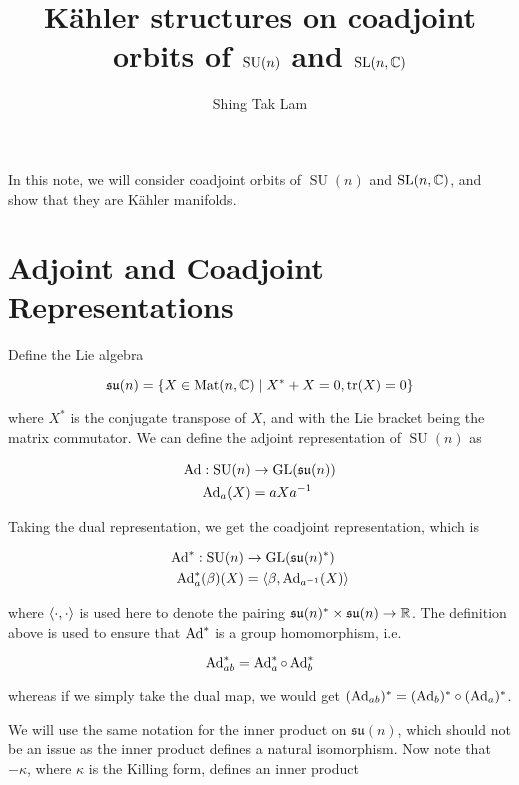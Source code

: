 \documentclass{article}
\title{K\"ahler structures on coadjoint orbits of \(\SU(n)\) and \(\operatorname{SL}(n, \mathbb{C})\)}
\author{Shing Tak Lam}
\DeclareMathOperator{\SU}{SU}
\newcommand{\su}{\mathfrak{su}}
\begin{document}
\maketitle

In this note, we will consider coadjoint orbits of \(\SU(n)\) and \(\operatorname{SL}(n, \mathbb{C})\), and show that they are K\"ahler manifolds.

\tableofcontents

\section{Adjoint and Coadjoint Representations}

\label{sec:adjoint}

Define the Lie algebra

\begin{equation}
    \label{eq:sun-def}
    \su(n) = \left\{X \in \Mat(n, \C) \mid X^* + X = 0, \tr(X) = 0\right\}
\end{equation}

where \(X^*\) is the conjugate transpose of \(X\), and with the Lie bracket being the matrix commutator. We can define the adjoint representation of \(\SU(n)\) as

\begin{align*}
    \Ad : \SU(n) &\to \GL(\su(n)) \\
    \Ad_a(X) &= aXa^{-1}
\end{align*}

Taking the dual representation, we get the coadjoint representation, which is

\begin{align*}
    \Ad^* : \SU(n) &\to \GL(\su(n)^*) \\
    \Ad^*_a(\beta)(X) &= \inner{\beta, \Ad_{a^{-1}}(X)}
\end{align*}

where \(\left\langle \cdot, \cdot \right\rangle\) is used here to denote the pairing \(\su(n)^* \times \su(n) \to \R\). The definition above is used to ensure that \(\operatorname{Ad}^*\) is a group homomorphism, i.e.

\[\operatorname{Ad}^*_{ab} = \operatorname{Ad}_a^* \circ \operatorname{Ad}_b^*\]

whereas if we simply take the dual map, we would get \((\operatorname{Ad}_{ab})^* = (\operatorname{Ad}_b)^* \circ (\operatorname{Ad}_a)^*\).

We will use the same notation for the inner product on \(\su(n)\), which should not be an issue as the inner product defines a natural isomorphism. Now note that \(-\kappa\), where \(\kappa\) is the Killing form, defines an inner product
\end{document}
